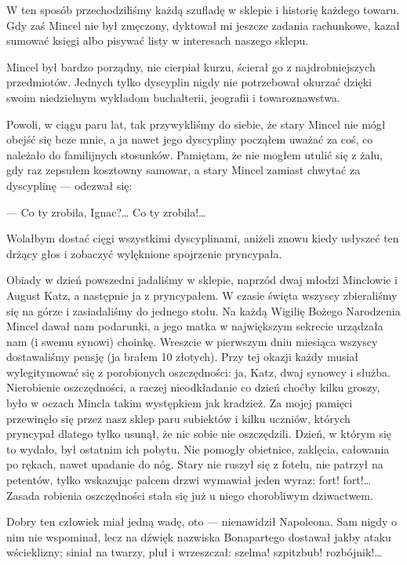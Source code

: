 \documentclass{book}
\begin{document}
W ten sposób przechodziliśmy każdą szufladę w sklepie i historię każdego towaru. Gdy zaś Mincel nie był zmęczony, dyktował mi jeszcze zadania rachunkowe, kazał sumować księgi albo pisywać listy w interesach naszego sklepu.

Mincel był bardzo porządny, nie cierpiał kurzu, ścierał go z najdrobniejszych przedmiotów. Jednych tylko dyscyplin nigdy nie potrzebował okurzać dzięki swoim niedzielnym wykładom buchalterii, jeografii i towaroznawstwa.

Powoli, w ciągu paru lat, tak przywykliśmy do siebie, że stary Mincel nie mógł obejść się beze mnie, a ja nawet jego dyscypliny począłem uważać za coś, co należało do familijnych stosunków. Pamiętam, że nie mogłem utulić się z żalu, gdy raz zepsułem kosztowny samowar, a stary Mincel zamiast chwytać za dyscyplinę — odezwał się:

— Co ty zrobila, Ignac?… Co ty zrobila!…

Wolałbym dostać cięgi wszystkimi dyscyplinami, aniżeli znowu kiedy usłyszeć ten drżący głos i zobaczyć wylęknione spojrzenie pryncypała.

Obiady w dzień powszedni jadaliśmy w sklepie, naprzód dwaj młodzi Minclowie i August Katz, a następnie ja z pryncypałem. W czasie święta wszyscy zbieraliśmy się na górze i zasiadaliśmy do jednego stołu. Na każdą Wigilię Bożego Narodzenia Mincel dawał nam podarunki, a jego matka w największym sekrecie urządzała nam (i swemu synowi) choinkę. Wreszcie w pierwszym dniu miesiąca wszyscy dostawaliśmy pensję (ja brałem 10 złotych). Przy tej okazji każdy musiał wylegitymować się z porobionych oszczędności: ja, Katz, dwaj synowcy i służba. Nierobienie oszczędności, a raczej nieodkładanie co dzień choćby kilku groszy, było w oczach Mincla takim występkiem jak kradzież. Za mojej pamięci przewinęło się przez nasz sklep paru subiektów i kilku uczniów, których pryncypał dlatego tylko usunął, że nic sobie nie oszczędzili. Dzień, w którym się to wydało, był ostatnim ich pobytu. Nie pomogły obietnice, zaklęcia, całowania po rękach, nawet upadanie do nóg. Stary nie ruszył się z fotelu, nie patrzył na petentów, tylko wskazując palcem drzwi wymawiał jeden wyraz: fort! fort!… Zasada robienia oszczędności stała się już u niego chorobliwym dziwactwem.

Dobry ten człowiek miał jedną wadę, oto — nienawidził Napoleona. Sam nigdy o nim nie wspominał, lecz na dźwięk nazwiska Bonapartego dostawał jakby ataku wścieklizny; siniał na twarzy, pluł i wrzeszczał: szelma! szpitzbub! rozbójnik!…
\end{document}
